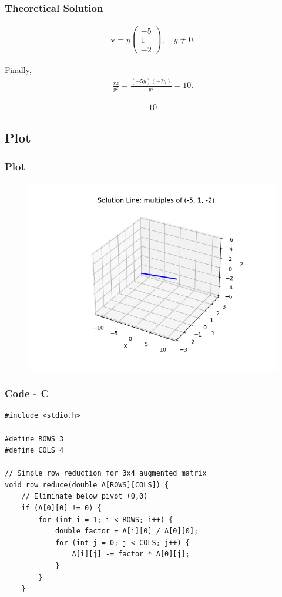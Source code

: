 \documentclass{beamer}
\theoremstyle{remark}
\newcommand{\myvec}[1]{\ensuremath{\begin{pmatrix}#1\end{pmatrix}}}
\let\vec\mathbf
\numberwithin{equation}{section}
\begin{document}
\begin{frame}
\frametitle{Theoretical Solution}
\begin{align}
\vec{v} = y\myvec{-5\\1\\-2}, \quad y\neq 0.
\end{align}

Finally,
\begin{align}
\frac{xz}{y^2} = \frac{(-5y)(-2y)}{y^2} = 10.
\end{align}

\begin{align}
\boxed{10}
\end{align}

\end{frame}

\subsection{Plot}
\begin{frame}
    \frametitle{Plot}
\begin{figure}[H]
   \centering
   \includegraphics[width=0.8\columnwidth]{figs/solvek.png}
   \caption{}
   \label{}
   \end{figure}
\end{frame}






\begin{frame}[fragile]
    \frametitle{Code - C}
    \begin{lstlisting}
#include <stdio.h>

#define ROWS 3
#define COLS 4

// Simple row reduction for 3x4 augmented matrix
void row_reduce(double A[ROWS][COLS]) {
    // Eliminate below pivot (0,0)
    if (A[0][0] != 0) {
        for (int i = 1; i < ROWS; i++) {
            double factor = A[i][0] / A[0][0];
            for (int j = 0; j < COLS; j++) {
                A[i][j] -= factor * A[0][j];
            }
        }
    }



    \end{lstlisting}
    \end{frame}
\end{document}
